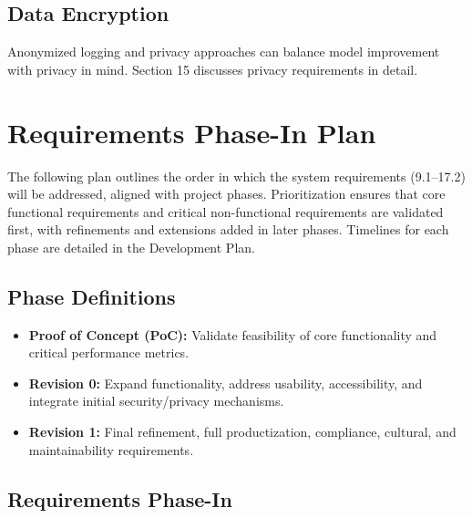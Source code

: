 \documentclass[12pt]{article}
\begin{document}
\subsection{Data Encryption}
Anonymized logging and privacy approaches can balance model improvement with privacy in mind. Section 15 discusses privacy requirements in detail.

\section{Requirements Phase-In Plan}

The following plan outlines the order in which the system requirements (9.1--17.2) will be addressed, aligned with project phases. Prioritization ensures that core functional requirements and critical non-functional requirements are validated first, with refinements and extensions added in later phases. Timelines for each phase are detailed in the Development Plan.

\subsection{Phase Definitions}

\begin{itemize}
    \item \textbf{Proof of Concept (PoC):} Validate feasibility of core functionality and critical performance metrics.
    \item \textbf{Revision 0:} Expand functionality, address usability, accessibility, and integrate initial security/privacy mechanisms.
    \item \textbf{Revision 1:} Final refinement, full productization, compliance, cultural, and maintainability requirements.
\end{itemize}

\subsection{Requirements Phase-In}
\end{document}
